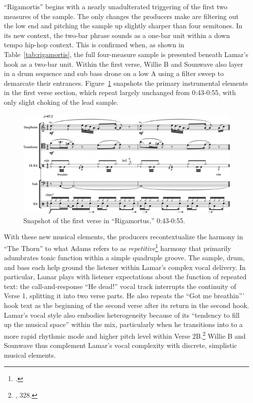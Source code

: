 ``Rigamortis'' begins with a nearly unadulterated triggering of the first two measures of the sample. The only changes the producers make are filtering out the low end and pitching the sample up slightly sharper than four semitones. In its new context, the two-bar phrase sounds as a one-bar unit within a down tempo hip-hop context. This is confirmed when, as shown in Table~\ref{tab:rigamortis}, the full four-measure sample is presented beneath Lamar's hook as a two-bar unit. Within the first verse, Willie B and Sounwave also layer in a drum sequence and sub bass drone on a low A using a filter sweep to demarcate their entrances. Figure~\ref{fig:rigamortisnoslip} snapshots the primary instrumental elements in the first verse section, which repeat largely unchanged from 0:43-0:55, with only slight choking of the lead sample.

\begin{figure}[ht]
    \centering
    \includegraphics[width=\textwidth]{images/figures/chp 02/043053rigamortusnoslip.pdf}
    \caption{Snapshot of the first verse in ``Rigamortus,'' 0:43-0:55.}
    \label{fig:rigamortisnoslip}
\end{figure}

With these new musical elements, the producers recontextualize the harmony in ``The Thorn'' to what Adams refers to as \emph{repetitive}\footnote{\cite{kyleadamsMetricalTechniquesFlow2009}.} harmony that primarily adumbrates tonic function within a simple quadruple groove. The sample, drum, and bass each help ground the listener within Lamar's complex vocal delivery. In particular, Lamar plays with listener expectations about the function of repeated text: the call-and-response ``He dead!'' vocal track interrupts the continuity of Verse 1, splitting it into two verse parts. He also repeats the ``Got me breathin''' hook text as the beginning of the second verse after its return in the second hook. Lamar's vocal style also embodies heterogeneity because of its ``tendency to fill up the musical space'' within the mix, particularly when he transitions into to a more rapid rhythmic mode and higher pitch level within Verse 2B.\footnote{\cite{ollywilsonHeterogeneousSoundIdeal1992}, 328.} Willie B and Sounwave thus complement Lamar's vocal complexity with discrete, simplistic musical elements.



